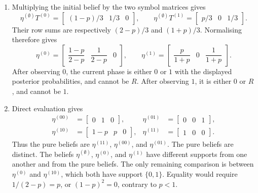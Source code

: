 \documentclass[11pt]{article}
\begin{document}
\begin{solution}[ex:p3-2]
    \begin{enumerate}
      \item Multiplying the initial belief by the two symbol matrices gives
        \[
          \eta^{(\emptyset)}T^{(0)}
            =\begin{bmatrix}(1-p)/3&1/3&0\end{bmatrix},
          \qquad
          \eta^{(\emptyset)}T^{(1)}
            =\begin{bmatrix}p/3&0&1/3\end{bmatrix}.
        \]
        Their row sums are respectively $(2-p)/3$ and $(1+p)/3$.
        Normalising therefore gives
        \[
          \eta^{(0)}
            =\begin{bmatrix}\dfrac{1-p}{2-p}&\dfrac1{2-p}&0\end{bmatrix},
          \qquad
          \eta^{(1)}
            =\begin{bmatrix}\dfrac p{1+p}&0&\dfrac1{1+p}\end{bmatrix}.
        \]
        After observing $0$, the current phase is either $0$ or $1$ with the
        displayed posterior probabilities, and cannot be $R$. After observing
        $1$, it is either $0$ or $R$, and cannot be $1$.

      \item Direct evaluation gives
        \[
          \begin{aligned}
            \eta^{(00)}&=\begin{bmatrix}0&1&0\end{bmatrix},&
            \eta^{(01)}&=\begin{bmatrix}0&0&1\end{bmatrix},\\
            \eta^{(10)}&=\begin{bmatrix}1-p&p&0\end{bmatrix},&
            \eta^{(11)}&=\begin{bmatrix}1&0&0\end{bmatrix}.
          \end{aligned}
        \]
        Thus the pure beliefs are $\eta^{(11)}$, $\eta^{(00)}$, and
        $\eta^{(01)}$.
        The pure beliefs are distinct. The beliefs
        $\eta^{(\emptyset)}$, $\eta^{(0)}$, and $\eta^{(1)}$ have different
        supports from one another and from the pure beliefs. The only remaining
        comparison is between $\eta^{(0)}$ and $\eta^{(10)}$, which both have
        support $\{0,1\}$. Equality would require
        $1/(2-p)=p$, or $(1-p)^2=0$, contrary to $p<1$.


\end{enumerate}
\end{solution}
\end{document}
